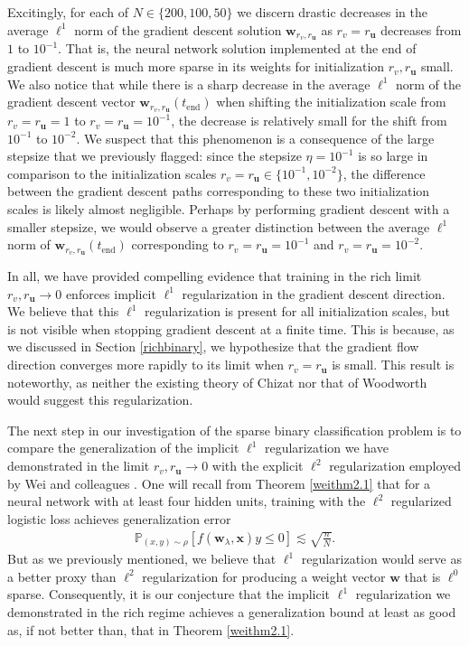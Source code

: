 \documentclass{article}
\begin{document}
Excitingly, for each of $N \in \{200, 100, 50\}$ we discern drastic decreases in the average $\ell^1$ norm of the gradient descent solution $\boldsymbol{w}_{r_v, r_{\boldsymbol{u}}}$ as $r_v = r_{\boldsymbol{u}}$ decreases from $1$ to $10^{-1}$. That is, the neural network solution implemented at the end of gradient descent is much more sparse in its weights for initialization $r_v, r_{\boldsymbol{u}}$ small. We also notice that while there is a sharp decrease in the average $\ell^1$ norm of the gradient descent vector $\boldsymbol{w}_{r_v, r_{\boldsymbol{u}}}(t_{\text{end}})$ when shifting the initialization scale from $r_v = r_{\boldsymbol{u}} = 1$ to $r_v = r_{\boldsymbol{u}} = 10^{-1}$, the decrease is relatively small for the shift from $10^{-1}$ to $10^{-2}$. We suspect that this phenomenon is a consequence of the large stepsize that we previously flagged: since the stepsize $\eta = 10^{-1}$ is so large in comparison to the initialization scales $r_v = r_{\boldsymbol{u}} \in \{10^{-1}, 10^{-2} \}$, the difference between the gradient descent paths corresponding to these two initialization scales is likely almost negligible. Perhaps by performing gradient descent with a smaller stepsize, we would observe a greater distinction between the average $\ell^1$ norm of $\boldsymbol{w}_{r_v, r_{\boldsymbol{u}}}(t_{\text{end}})$ corresponding to $r_v = r_{\boldsymbol{u}} = 10^{-1}$ and $r_v = r_{\boldsymbol{u}} = 10^{-2}$. 

In all, we have provided compelling evidence that training in the rich limit $r_{v}, r_{\boldsymbol{u}} \rightarrow 0$ enforces implicit $\ell^1$ regularization in the gradient descent direction. We believe that this $\ell^1$ regularization is present for all initialization scales, but is not visible when stopping gradient descent at a finite time. This is because, as we discussed in Section \ref{richbinary}, we hypothesize that the gradient flow direction converges more rapidly to its limit when $r_v = r_{\boldsymbol{u}}$ is small. This result is noteworthy, as neither the existing theory of Chizat nor that of Woodworth would suggest this regularization. 

The next step in our investigation of the sparse binary classification problem is to compare the generalization of the implicit $\ell^1$ regularization we have demonstrated in the limit $r_v, r_{\boldsymbol{u}} \rightarrow 0$ with the explicit $\ell^2$ regularization employed by Wei and colleagues \cite{wei2019regularization}. One will recall from Theorem \ref{weithm2.1} that for a neural network with at least four hidden units, training with the $\ell^2$ regularized logistic loss achieves generalization error
\begin{align*}
   \mathbb{P}_{(x,y) \sim \rho}[f(\boldsymbol{w}_{\lambda}, \boldsymbol{x})y \leq 0] \lesssim \sqrt{\frac{n}{N}}.
\end{align*}
But as we previously mentioned, we believe that $\ell^1$ regularization would serve as a better proxy than $\ell^2$ regularization for producing a weight vector $\boldsymbol{w}$ that is $\ell^0$ sparse. Consequently, it is our conjecture that the implicit $\ell^1$ regularization we demonstrated in the rich regime achieves a generalization bound at least as good as, if not better than, that in Theorem \ref{weithm2.1}.
\end{document}
